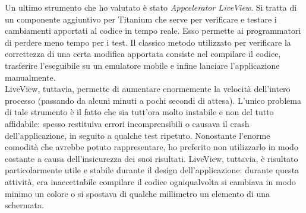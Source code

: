 				Un ultimo strumento che ho valutato è stato \emph{Appcelerator LiveView}. Si tratta di un componente aggiuntivo per
				Titanium che serve per verificare e testare i cambiamenti apportati al codice in tempo reale. Esso permette ai
				programmatori di perdere meno tempo per i test. Il classico metodo utilizzato per verificare la correttezza
				di una certa modifica apportata consiste nel compilare il codice, trasferire l'eseguibile su un emulatore mobile e
				infine lanciare l'applicazione manualmente.\\
				
				\noindent LiveView, tuttavia, permette di aumentare enormemente la velocità dell'intero processo (passando da alcuni
				minuti a pochi secondi di attesa). L'unico problema di tale strumento è il fatto che sia tutt'ora molto instabile e
				non del tutto affidabile: spesso restituiva errori incomprensibili o causava il crash dell'applicazione, in seguito a
				qualche test ripetuto. Nonostante l'enorme comodità che avrebbe potuto rappresentare, ho preferito non utilizzarlo
				in modo costante a causa dell'insicurezza dei suoi risultati. LiveView, tuttavia, è risultato particolarmente utile
				e stabile durante il design dell'applicazione: durante questa attività, era inaccettabile compilare il codice
				ogniqualvolta si cambiava in modo minimo un colore o si spostava di qualche millimetro un elemento di una schermata.
